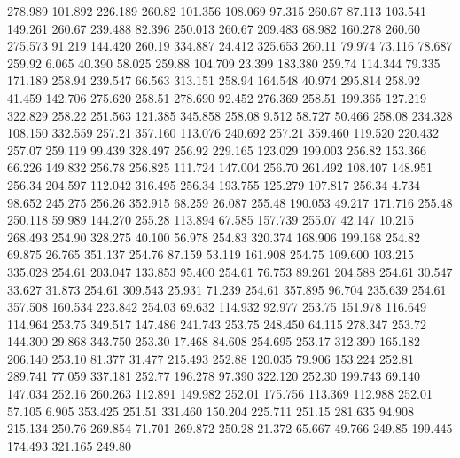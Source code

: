  278.989  101.892  226.189       260.82
 101.356  108.069   97.315       260.67
  87.113  103.541  149.261       260.67
 239.488   82.396  250.013       260.67
 209.483   68.982  160.278       260.60
 275.573   91.219  144.420       260.19
 334.887   24.412  325.653       260.11
  79.974   73.116   78.687       259.92
   6.065   40.390   58.025       259.88
 104.709   23.399  183.380       259.74
 114.344   79.335  171.189       258.94
 239.547   66.563  313.151       258.94
 164.548   40.974  295.814       258.92
  41.459  142.706  275.620       258.51
 278.690   92.452  276.369       258.51
 199.365  127.219  322.829       258.22
 251.563  121.385  345.858       258.08
   9.512   58.727   50.466       258.08
 234.328  108.150  332.559       257.21
 357.160  113.076  240.692       257.21
 359.460  119.520  220.432       257.07
 259.119   99.439  328.497       256.92
 229.165  123.029  199.003       256.82
 153.366   66.226  149.832       256.78
 256.825  111.724  147.004       256.70
 261.492  108.407  148.951       256.34
 204.597  112.042  316.495       256.34
 193.755  125.279  107.817       256.34
   4.734   98.652  245.275       256.26
 352.915   68.259   26.087       255.48
 190.053   49.217  171.716       255.48
 250.118   59.989  144.270       255.28
 113.894   67.585  157.739       255.07
  42.147   10.215  268.493       254.90
 328.275   40.100   56.978       254.83
 320.374  168.906  199.168       254.82
  69.875   26.765  351.137       254.76
  87.159   53.119  161.908       254.75
 109.600  103.215  335.028       254.61
 203.047  133.853   95.400       254.61
  76.753   89.261  204.588       254.61
  30.547   33.627   31.873       254.61
 309.543   25.931   71.239       254.61
 357.895   96.704  235.639       254.61
 357.508  160.534  223.842       254.03
  69.632  114.932   92.977       253.75
 151.978  116.649  114.964       253.75
 349.517  147.486  241.743       253.75
 248.450   64.115  278.347       253.72
 144.300   29.868  343.750       253.30
  17.468   84.608  254.695       253.17
 312.390  165.182  206.140       253.10
  81.377   31.477  215.493       252.88
 120.035   79.906  153.224       252.81
 289.741   77.059  337.181       252.77
 196.278   97.390  322.120       252.30
 199.743   69.140  147.034       252.16
 260.263  112.891  149.982       252.01
 175.756  113.369  112.988       252.01
  57.105    6.905  353.425       251.51
 331.460  150.204  225.711       251.15
 281.635   94.908  215.134       250.76
 269.854   71.701  269.872       250.28
  21.372   65.667   49.766       249.85
 199.445  174.493  321.165       249.80
